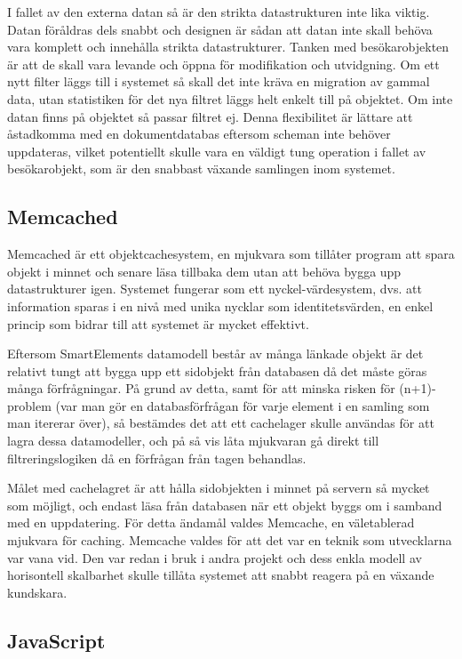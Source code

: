 I fallet av den externa datan så är den strikta datastrukturen inte lika viktig. Datan föråldras dels snabbt och designen är sådan att datan inte skall behöva vara komplett och innehålla strikta datastrukturer. Tanken med besökarobjekten är att de skall vara levande och öppna för modifikation och utvidgning. Om ett nytt filter läggs till i systemet så skall det inte kräva en migration av gammal data, utan statistiken för det nya filtret läggs helt enkelt till på objektet. Om inte datan finns på objektet så passar filtret ej. Denna flexibilitet är lättare att åstadkomma med en dokumentdatabas eftersom scheman inte behöver uppdateras, vilket potentiellt skulle vara en väldigt tung operation i fallet av besökarobjekt, som är den snabbast växande samlingen inom systemet.

\subsection{Memcached}

Memcached är ett objektcachesystem, en mjukvara som tillåter program att spara objekt i minnet och senare läsa tillbaka dem utan att behöva bygga upp datastrukturer igen. Systemet fungerar som ett nyckel-värdesystem, dvs. att information sparas i en nivå med unika nycklar som identitetsvärden, en enkel princip som bidrar till att systemet är mycket effektivt. \citep{memcachedwiki}

Eftersom SmartElements datamodell består av många länkade objekt är det relativt tungt att bygga upp ett sidobjekt från databasen då det måste göras många förfrågningar. På grund av detta, samt för att minska risken för (n+1)-problem (var man gör en databasförfrågan för varje element i en samling som man itererar över), så bestämdes det att ett cachelager skulle användas för att lagra dessa datamodeller, och på så vis låta mjukvaran gå direkt till filtreringslogiken då en förfrågan från tagen behandlas.

Målet med cachelagret är att hålla sidobjekten i minnet på servern så mycket som möjligt, och endast läsa från databasen när ett objekt byggs om i samband med en uppdatering. För detta ändamål valdes Memcache, en väletablerad mjukvara för caching. Memcache valdes för att det var en teknik som utvecklarna var vana vid. Den var redan i bruk i andra projekt och dess enkla modell av horisontell skalbarhet skulle tillåta systemet att snabbt reagera på en växande kundskara.

\subsection{JavaScript}

